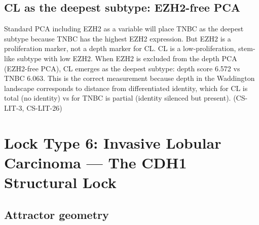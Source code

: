 \documentclass[12pt, a4paper]{article}
\begin{document}
\subsection{CL as the deepest subtype: EZH2-free PCA}

Standard PCA including EZH2 as a variable will
place TNBC as the deepest subtype because TNBC
has the highest EZH2 expression. But EZH2 is a
proliferation marker, not a depth marker for CL.
CL is a low-proliferation, stem-like subtype
with low EZH2. When EZH2 is excluded from the
depth PCA (EZH2-free PCA), CL emerges as the
deepest subtype: depth score 6.572 vs TNBC 6.063.
This is the correct measurement because depth
in the Waddington landscape corresponds to
distance from differentiated identity, which
for CL is total (no identity) vs for TNBC is
partial (identity silenced but present).
(CS-LIT-3, CS-LIT-26)

\section{Lock Type 6: Invasive Lobular Carcinoma ---
The CDH1 Structural Lock}

\subsection{Attractor geometry}
\end{document}
